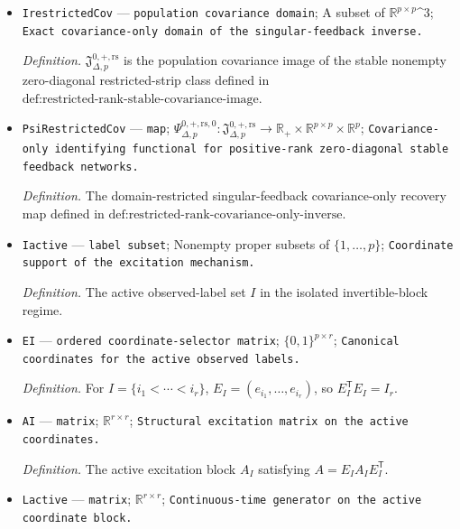 \documentclass{article}
\begin{document}
\begin{itemize}
  \par\smallskip\noindent\emph{Definition.} The domain-restricted full-rank covariance-only recovery map defined in \(\text{def:full-rank-covariance-only-inverse}\).
  \item \texttt{IrestrictedCov} --- \texttt{population covariance domain}; A subset of \(\mathbb R^{p\times p}\)\textasciicircum{}3; \texttt{Exact covariance-\allowbreak{}only domain of the singular-\allowbreak{}feedback inverse.}
  \par\smallskip\noindent\emph{Definition.} \(\mathfrak J_{\Delta,p}^{0,+,\mathrm{rs}}\) is the population covariance image of the stable nonempty zero-diagonal restricted-strip class defined in \(\text{def:restricted-rank-stable-covariance-image}\).
  \item \texttt{PsiRestrictedCov} --- \texttt{map}; \(\Psi_{\Delta,p}^{0,+,\mathrm{rs},0}:\mathfrak J_{\Delta,p}^{0,+,\mathrm{rs}}\to\mathbb R_+\times\mathbb R^{p\times p}\times\mathbb R^p\); \texttt{Covariance-\allowbreak{}only identifying functional for positive-\allowbreak{}rank zero-\allowbreak{}diagonal stable feedback networks.}
  \par\smallskip\noindent\emph{Definition.} The domain-restricted singular-feedback covariance-only recovery map defined in \(\text{def:restricted-rank-covariance-only-inverse}\).
  \item \texttt{Iactive} --- \texttt{label subset}; Nonempty proper subsets of \(\{1,\ldots,p\}\); \texttt{Coordinate support of the excitation mechanism.}
  \par\smallskip\noindent\emph{Definition.} The active observed-label set \(I\) in the isolated invertible-block regime.
  \item \texttt{EI} --- \texttt{ordered coordinate-\allowbreak{}selector matrix}; \(\{0,1\}^{p\times r}\); \texttt{Canonical coordinates for the active observed labels.}
  \par\smallskip\noindent\emph{Definition.} For \(I=\{i_1<\cdots<i_r\}\), \(E_I=(e_{i_1},\ldots,e_{i_r})\), so \(E_I^{\mathsf T}E_I=I_r\).
  \item \texttt{AI} --- \texttt{matrix}; \(\mathbb R^{r\times r}\); \texttt{Structural excitation matrix on the active coordinates.}
  \par\smallskip\noindent\emph{Definition.} The active excitation block \(A_I\) satisfying \(A=E_IA_IE_I^{\mathsf T}\).
  \item \texttt{Lactive} --- \texttt{matrix}; \(\mathbb R^{r\times r}\); \texttt{Continuous-\allowbreak{}time generator on the active coordinate block.}

\end{itemize}
\end{document}
